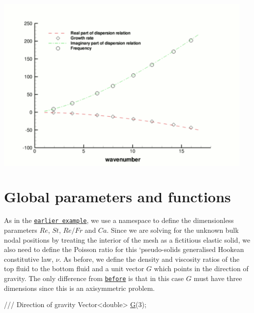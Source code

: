  
\begin{DoxyImage}
\includegraphics[width=0.95\textwidth]{two_layer_interface_axisym_code_validation}
\end{DoxyImage}




 

\hypertarget{index_namespace}{}\section{Global parameters and functions}\label{index_namespace}
As in the \href{../../../navier_stokes/two_layer_interface/html/index.html#namespace}{\tt earlier example}, we use a namespace to define the dimensionless parameters $ Re $, $ St $, $ Re/Fr $ and $ Ca $. Since we are solving for the unknown bulk nodal positions by treating the interior of the mesh as a fictitious elastic solid, we also need to define the Poisson ratio for this `pseudo-\/solid\textquotesingle{}s\textquotesingle{} generalised Hookean constitutive law, $ \nu $. As before, we define the density and viscosity ratios of the top fluid to the bottom fluid and a unit vector $ G $ which points in the direction of gravity. The only difference from \href{../../../navier_stokes/two_layer_interface/html/index.html#namespace}{\tt before} is that in this case $ G $ must have three dimensions since this is an axisymmetric problem.

 
\begin{DoxyCodeInclude}
 \textcolor{comment}{/// Direction of gravity}
 Vector<double> \hyperlink{namespaceGlobal__Physical__Variables_af5ae275cf339105b9a54821c034df470}{G}(3);

\end{DoxyCodeInclude}




